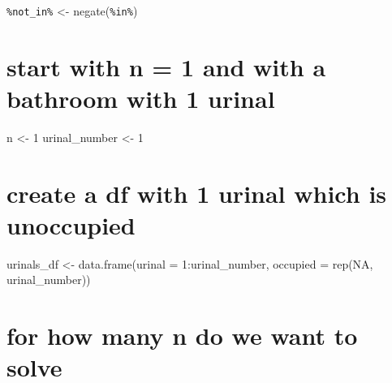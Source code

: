 \documentclass[]{article}
\begin{document}
\texttt{\%not\_in\%} \textless{}- negate(\texttt{\%in\%})

\section{start with n = 1 and with a bathroom with 1
urinal}\label{start-with-n-1-and-with-a-bathroom-with-1-urinal}

n \textless{}- 1 urinal\_number \textless{}- 1

\section{create a df with 1 urinal which is
unoccupied}\label{create-a-df-with-1-urinal-which-is-unoccupied}

urinals\_df \textless{}- data.frame(urinal = 1:urinal\_number, occupied
= rep(NA, urinal\_number))

\section{for how many n do we want to
solve}\label{for-how-many-n-do-we-want-to-solve}
\end{document}
